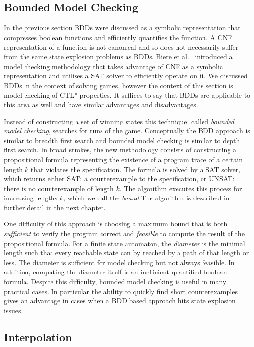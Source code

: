 \subsection{Bounded Model Checking}
\label{sec:boundedmodelchecking}

In the previous section BDDs were discussed as a symbolic representation that compresses boolean functions and efficiently quantifies the function. A CNF representation of a function is not canonical and so does not necessarily suffer from the same state explosion problems as BDDs. Biere et al.~\cite{Biere99} introduced a model checking methodology that takes advantage of CNF as a symbolic representation and utilises a SAT solver to efficiently operate on it. We discussed BDDs in the context of solving games, however the context of this section is model checking of CTL* properties. It suffices to say that BDDs are applicable to this area as well and have similar advantages and disadvantages.

Instead of constructing a set of winning states this technique, called \emph{bounded model checking}, searches for runs of the game. Conceptually the BDD approach is similar to breadth first search and bounded model checking is similar to depth first search. In broad strokes, the new methodology consists of constructing a propositional formula representing the existence of a program trace of a certain length $k$ that violates the specification. The formula is solved by a SAT solver, which returns either SAT: a counterexample to the specification, or UNSAT: there is no counterexample of length $k$. The algorithm executes this process for increasing lengths $k$, which we call the \emph{bound}.The algorithm is described in further detail in the next chapter.

One difficulty of this approach is choosing a maximum bound that is both \emph{sufficient} to verify the program correct and \emph{feasible} to compute the result of the propositional formula. For a finite state automaton, the \emph{diameter} is the minimal length such that every reachable state can by reached by a path of that length or less. The diameter is sufficient for model checking but not always feasible. In addition, computing the diameter itself is an inefficient quantified boolean formula. Despite this difficulty, bounded model checking is useful in many practical cases. In particular the ability to quickly find short counterexamples gives an advantage in cases when a BDD based approach hits state explosion issues.

\subsection{Interpolation}
\label{sec:backgroundInterpolation}

